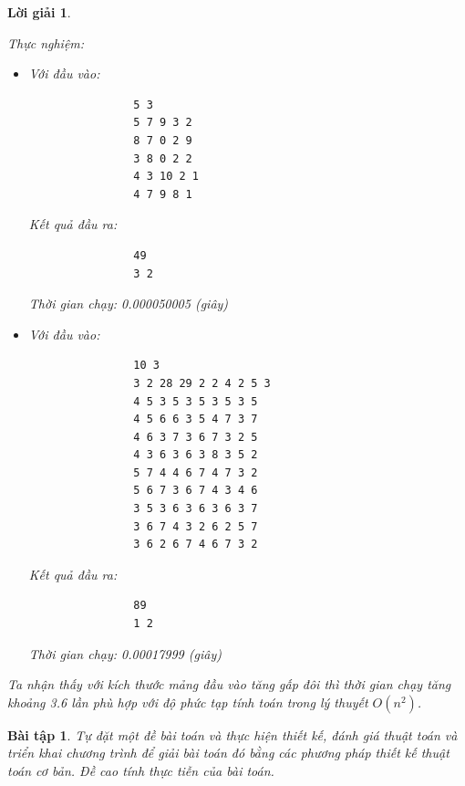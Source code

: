 \documentclass[14pt, a4paper]{article}
\theoremstyle{sltheorem}
\newtheorem{baitap}{Bài tập}
\theoremstyle{soltheorem}
\newtheorem*{loigiai}{Lời giải}
\begin{document}
\begin{loigiai}
\begin{itemize} [label={$-$}]
        Thực nghiệm:

        \begin{itemize}
            \item Với đầu vào:
            \begin{verbatim}
                5 3        
                5 7 9 3 2
                8 7 0 2 9
                3 8 0 2 2
                4 3 10 2 1
                4 7 9 8 1
            \end{verbatim}
            Kết quả đầu ra:
            \begin{verbatim}
                49
                3 2
            \end{verbatim}
            Thời gian chạy: 0.000050005 (giây)
            \item Với đầu vào:
            \begin{verbatim}
                10 3
                3 2 28 29 2 2 4 2 5 3
                4 5 3 5 3 5 3 5 3 5
                4 5 6 6 3 5 4 7 3 7
                4 6 3 7 3 6 7 3 2 5
                4 3 6 3 6 3 8 3 5 2
                5 7 4 4 6 7 4 7 3 2
                5 6 7 3 6 7 4 3 4 6
                3 5 3 6 3 6 3 6 3 7
                3 6 7 4 3 2 6 2 5 7
                3 6 2 6 7 4 6 7 3 2
            \end{verbatim}
            Kết quả đầu ra:
            \begin{verbatim}
                89
                1 2
            \end{verbatim}
            Thời gian chạy: 0.00017999 (giây)
        \end{itemize}

        Ta nhận thấy với kích thước mảng đầu vào tăng gấp đôi thì thời gian chạy tăng khoảng 3.6 lần phù hợp với độ phức tạp tính toán trong lý thuyết $O(n^2)$.

    \end{itemize}

    \end{loigiai}

    \begin{baitap}
        Tự đặt một đề bài toán và thực hiện thiết kế, đánh giá thuật toán và triển khai
        chương trình để giải bài toán đó bằng các phương pháp thiết kế thuật toán cơ bản.
        Đề cao tính thực tiễn của bài toán.

    \end{baitap}
\end{document}
